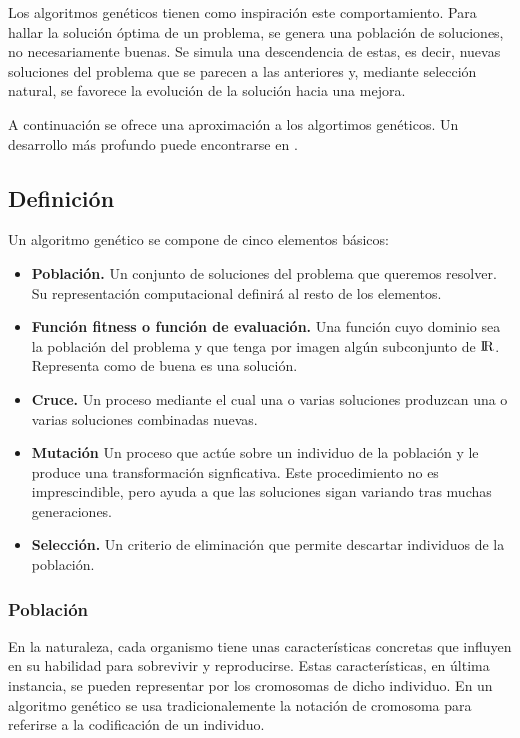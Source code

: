 \documentclass[12pt,a4paper]{article}
\begin{document}
		Los algoritmos gen\'eticos tienen como inspiraci\'on este comportamiento. Para hallar la soluci\'on \'optima de un problema, se genera una poblaci\'on de soluciones, no necesariamente buenas. Se simula una descendencia de estas, es decir, nuevas soluciones del problema que se parecen a las anteriores y, mediante selecci\'on natural, se favorece la evoluci\'on de la soluci\'on hacia una mejora.
		
		A continuaci\'on se ofrece una aproximaci\'on a los algortimos gen\'eticos. Un desarrollo m\'as profundo puede encontrarse en \cite{comput_intelli}.
		
		\subsection{Definici\'on}
		Un algoritmo gen\'etico se compone de cinco elementos b\'asicos:
		
		\begin{itemize}
			\item \textbf{Poblaci\'on.} Un conjunto de soluciones del problema que queremos resolver. Su representaci\'on computacional definir\'a al resto de los elementos.
			\item \textbf{Funci\'on fitness o funci\'on de evaluaci\'on.} Una funci\'on cuyo dominio sea la poblaci\'on del problema y que tenga por imagen alg\'un subconjunto de ${\rm I\!R}$. Representa como de buena es una soluci\'on.
			\item \textbf{Cruce.} Un proceso mediante el cual una o varias soluciones produzcan una o varias soluciones combinadas nuevas.
			\item \textbf{Mutaci\'on} Un proceso que act\'ue sobre un individuo de la poblaci\'on y le produce una transformaci\'on signficativa. Este procedimiento no es imprescindible, pero ayuda a que las soluciones sigan variando tras muchas generaciones.
			\item \textbf{Selecci\'on.} Un criterio de eliminaci\'on que permite descartar individuos de la poblaci\'on.
		\end{itemize}
		
			\subsubsection{Poblaci\'on}
			En la naturaleza, cada organismo tiene unas caracter\'isticas concretas que influyen en su habilidad para sobrevivir y reproducirse. Estas caracter\'isticas, en  \'ultima instancia, se pueden representar por los cromosomas de dicho individuo. En un algoritmo gen\'etico se usa tradicionalemente la notaci\'on de cromosoma para referirse a la codificaci\'on de un individuo.\\
			
\end{document}

